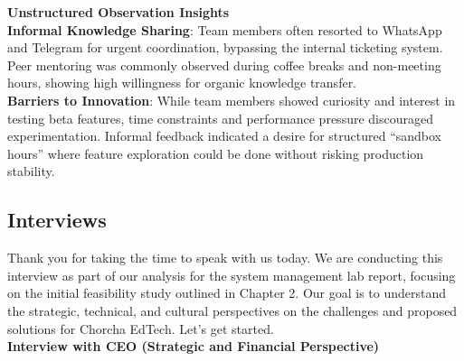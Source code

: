 \documentclass[12pt,a4paper,oneside]{book}
\begin{document}
\textbf{Unstructured Observation Insights} \\

\textbf{Informal Knowledge Sharing}: Team members often resorted to WhatsApp and Telegram for urgent coordination, bypassing the internal ticketing system. Peer mentoring was commonly observed during coffee breaks and non-meeting hours, showing high willingness for organic knowledge transfer.\\

\textbf{Barriers to Innovation}: While team members showed curiosity and interest in testing beta features, time constraints and performance pressure discouraged experimentation. Informal feedback indicated a desire for structured “sandbox hours” where feature exploration could be done without risking production stability.\\



\subsection{Interviews}

Thank you for taking the time to speak with us today. We are conducting this interview as part of our analysis for the system management lab report, focusing on the initial feasibility study outlined in Chapter 2. Our goal is to understand the strategic, technical, and cultural perspectives on the challenges and proposed solutions for Chorcha EdTech. Let’s get started.\\

\textbf{Interview with CEO (Strategic and Financial Perspective)}
\end{document}
